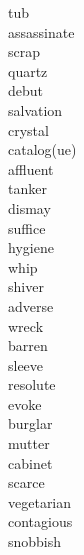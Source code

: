 \documentclass[a4paper, 11pt]{ctexart}
\begin{document}
\begin{multicols*}{3}
\begin{description}
\item[tub]

\item[assassinate]

\item[scrap]

\item[quartz]

\item[debut]

\item[salvation]

\item[crystal]

\item[catalog(ue)]

\item[affluent]

\item[tanker]

\item[dismay]

\item[suffice]

\item[hygiene]

\item[whip]

\item[shiver]

\item[adverse]

\item[wreck]

\item[barren]

\item[sleeve]

\item[resolute]

\item[evoke]

\item[burglar]

\item[mutter]

\item[cabinet]

\item[scarce]

\item[vegetarian]

\item[contagious]

\item[snobbish]


\end{description}
\end{multicols*}
\end{document}
